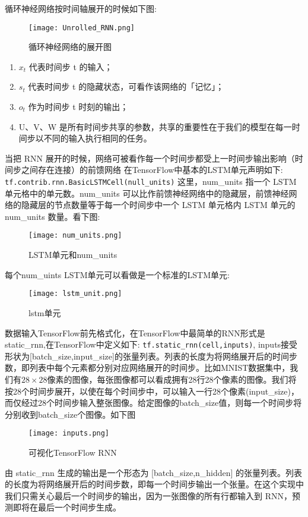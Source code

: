 循环神经网络按时间轴展开的时候如下图:
\begin{figure}[H]
	\texttt{[image: Unrolled\_RNN.png]}
	\caption{循环神经网络的展开图}
\end{figure}
\begin{enumerate}
\item $x_t$ 代表时间步 t 的输入；
\item $s_t$ 代表时间步 t 的隐藏状态，可看作该网络的「记忆」；
\item $o_t$ 作为时间步 t 时刻的输出；
\item U、V、W 是所有时间步共享的参数，共享的重要性在于我们的模型在每一时间步以不同的输入执行相同的任务。
\end{enumerate}
当把 RNN 展开的时候，网络可被看作每一个时间步都受上一时间步输出影响（时间步之间存在连接）的前馈网络
在TensorFlow中基本的LSTM单元声明如下:
\lstinline[language=Python]{tf.contrib.rnn.BasicLSTMCell(null_units)}
这里，num\_units 指一个 LSTM 单元格中的单元数。num\_units 可以比作前馈神经网络中的隐藏层，前馈神经网络的隐藏层的节点数量等于每一个时间步中一个 LSTM 单元格内 LSTM 单元的 num\_units 数量。看下图:
\begin{figure}[H]
	\texttt{[image: num\_units.png]}
	\caption{LSTM单元和num\_units}
\end{figure}
每个num\_uints LSTM单元可以看做是一个标准的LSTM单元:
\begin{figure}[H]
	\texttt{[image: lstm\_unit.png]}
	\caption{lstm单元}
\end{figure}
数据输入TensorFlow前先格式化，在TensorFlow中最简单的RNN形式是static\_rnn,在TensorFlow中定义如下:
\lstinline[language=Python]{tf.static_rnn(cell,inputs)},
inputs接受形状为[batch\_size,input\_size]的张量列表。列表的长度为将网络展开后的时间步数，即列表中每个元素都分别对应网络展开的时间步。比如MNIST数据集中，我们有$28\times28$像素的图像，每张图像都可以看成拥有28行28个像素的图像。我们将按28个时间步展开，以使在每个时间步中，可以输入一行28个像素(input\_size)，而仅经过28个时间步输入整张图像。给定图像的batch\_size值，则每一个时间步将分别收到batch\_size个图像。如下图
\begin{figure}[H]
	\texttt{[image: inputs.png]}
	\caption{可视化TensorFlow RNN}
\end{figure}
由 static\_rnn 生成的输出是一个形态为 [batch\_size,n\_hidden] 的张量列表。列表的长度为将网络展开后的时间步数，即每一个时间步输出一个张量。在这个实现中我们只需关心最后一个时间步的输出，因为一张图像的所有行都输入到 RNN，预测即将在最后一个时间步生成。
